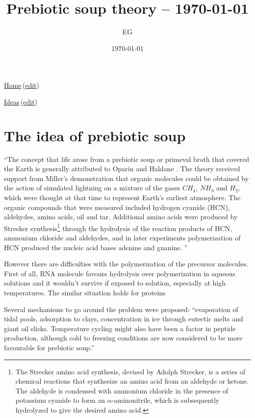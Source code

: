 \documentclass[12pt]{paper}
\title{Prebiotic soup theory -- \today}
\author{EG}
\date{\today}
\newcommand{\ga}{\alpha}
\newcommand{\wikilink}[2] { \href{#1.pdf}{#2}\,(\href{#1.tex}{edit})}
\begin{document}
 \maketitle
\wikilink{home}{Home}

\wikilink{ideas}{Ideas}

\section{The idea of prebiotic soup}
``The concept that life arose from a prebiotic soup or primeval broth that covered the Earth is 
generally attributed to Oparin \cite{Oparin1952} and Haldane \cite{Haldane1929}. The theory 
received support from Miller’s \cite{Miller1953} demonstration that organic molecules could be
obtained by the action of simulated lightning on a mixture of the gases $CH_4$, $NH_3$ and $H_2$, 
which were thought at that time to represent Earth’s earliest atmosphere. The organic compounds 
that were measured included hydrogen cyanide (HCN), aldehydes, amino acids, oil and tar. Additional 
amino acids were produced by Strecker synthesis\footnote{The Strecker amino acid synthesis, devised 
by Adolph Strecker, is a series of chemical reactions that synthesize an amino acid from an 
aldehyde or ketone. The aldehyde is condensed with ammonium chloride in the presence of 
potassium cyanide to form an $\ga$-aminonitrile, which is subsequently hydrolyzed to give the 
desired amino acid.}
 through the hydrolysis of the reaction products of 
HCN, ammonium chloride and aldehydes, and in later experiments polymerization of HCN
produced the nucleic acid bases adenine and guanine. ''\cite{Martin2008}

However there are difficulties with the polymerization of the precursor molecules. First of all, 
RNA molecule favours hydrolysis over polymerization in aqueous solutions and it wouldn't survive 
if exposed to solution, especially at high temperatures\cite{Pace1991}. The similar situation 
holds for proteins \cite{Lambert2008}

Several mechanisms to go around the problem were proposed: ``evaporation of tidal pools, 
adsorption to clays, concentration in ice through eutectic melts and giant oil
slicks. Temperature cycling might also have been a factor in peptide production, although cold to 
freezing conditions are now considered to be more favourable for prebiotic 
soup\cite{Bada2004}.''\cite{Martin2008}




   
    
\end{document}
